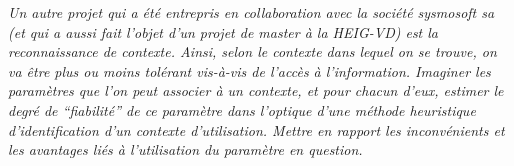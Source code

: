 \documentclass[a4paper,11pt,titlepage]{article}
\begin{document}
\textit{Un autre projet qui a été entrepris en collaboration avec la société sysmosoft sa (et qui a aussi fait
l'objet d'un projet de master à la HEIG-VD) est la reconnaissance  de contexte. Ainsi, selon le contexte dans
lequel on se trouve, on va être plus ou moins tolérant vis-à-vis de l'accès à l'information. Imaginer les
paramètres que l'on peut associer à un contexte, et pour chacun d'eux, estimer le degré de ``fiabilité'' de
ce paramètre dans l'optique d'une méthode heuristique d'identification d'un contexte d'utilisation. Mettre
en rapport les inconvénients et les avantages liés à l'utilisation du paramètre en question.}
\end{document}

